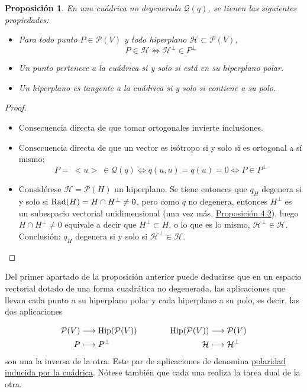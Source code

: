 \documentclass[12pt]{report}
\newtheorem{proposition}{Proposición}[chapter]
\theoremstyle{definition}
\theoremstyle{definition}
\theoremstyle{remark}
\begin{document}
\begin{proposition}
\label{prop5.2.}
En una cuádrica no degenerada $\mathcal{Q}(q)$, se tienen las siguientes propiedades:
\begin{itemize}
    \item[(i)] Para todo punto $P \in \mathcal{P}(V)$ y todo hiperplano $\mathcal{H} \subset \mathcal{P}(V)$,
    \[P \in \mathcal{H} \iff \mathcal{H}^\perp \in P^\perp\]
    \item[(ii)] Un punto pertenece a la cuádrica si y solo si está en su hiperplano polar.
    \item[(iii)] Un hiperplano es tangente a la cuádrica si y solo si contiene a su polo.
\end{itemize}
\end{proposition}

\begin{proof}
\hfill
\begin{itemize}
    \item[(i)] Consecuencia directa de que tomar ortogonales invierte inclusiones.
    \item[(ii)] Consecuencia directa de que un vector es isótropo si y solo si es ortogonal a sí mismo:
    \[P = \ <u> \ \in \mathcal{Q}(q) \iff q(u,u) = q(u) = 0 \iff P \in P^\perp\]
    \item[(iii)] Considérese $\mathcal{H} = \mathcal{P}(H)$ un hiperplano. Se tiene entonces que $q_H$ degenera si y solo si $\textup{Rad}(H) = H \cap H^\perp \neq 0$, pero como $q$ no degenera, entonces $H^\perp$ es un subespacio vectorial unidimensional (una vez más, \hyperref[prop4.1.]{\color{blue}Proposición 4.2}), luego $H \cap H^\perp \neq 0$ equivale a decir que $H^\perp \subset H$, o lo que es lo mismo, $\mathcal{H}^\perp \in \mathcal{H}$. Conclusión: $q_H$ degenera si y solo si $\mathcal{H}^\perp \in \mathcal{H}$.
\end{itemize}
\end{proof}

Del primer apartado de la proposición anterior puede deducirse que en un espacio vectorial dotado de una forma cuadrática no degenerada, las aplicaciones que llevan cada punto a su hiperplano polar y cada hiperplano a su polo, es decir, las dos aplicaciones

\begin{equation*}
\begin{aligned}[t]
\mathcal{P}(V) &\longrightarrow \textup{Hip}(\mathcal{P}(V)) \\
P &\longmapsto P^\perp
\end{aligned}
\qquad \qquad 
\begin{aligned}[t]
\textup{Hip}(\mathcal{P}(V)) &\longrightarrow \mathcal{P}(V) \\
\mathcal{H} &\longmapsto \mathcal{H}^\perp
\end{aligned}
\end{equation*}
son una la inversa de la otra. Este par de aplicaciones de denomina \ul{polaridad inducida por la cuádrica}. Nótese también que cada una realiza la tarea dual de la otra.
\end{document}

